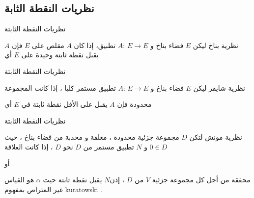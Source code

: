 \documentclass[dvipsnames,mathserif]{beamer}
\begin{document}
  \subsection{نظريات النقطة الثابة }
    \begin{frame}{ نظريات النقطة الثابتة }
\begin{mybox}[colbacktitle = green]{ نظرية بناخ}
{\LARGE{}}
ليكن $E$ فضاء بناخ و $A:\,E\to E$  تطبيق،
إذا كان  $A$  مقلص على  $E$ فإن  $A$ يقبل نقطة ثابتة وحيدة على  
$E$
 أي  
\begin{center}
\end{center}
  \end{mybox}
  \end{frame}
  \begin{frame}{ نظريات النقطة الثابتة }
   \begin{mybox}[colbacktitle = green]{ نظرية شايفر}
{\LARGE{}}
ليكن  $E$ فضاء بناخ و $A:\,E\to E$ تطبيق مستمر كليا ،
إذا كانت المجموعة
\begin{center}
 \otherbox{ \xi=\left. \big\{ y\in E\,,\,y=\lambda Ay\,,\,\lambda \in \big] 0,1 \big[ \big. \right\}} 
 \end{center}
 محدودة
فإن  $A$  يقبل على الأقل نقطة ثابتة في  $E$  أي 

  \end{mybox}
  \end{frame}
  \begin{frame}{ نظريات النقطة الثابتة }
   \vspace{-0.3cm}
     \begin{mybox}[colbacktitle = green]{ نظرية مونش}
{\LARGE{}}
لتكن $D$ مجموعة جزئية محدودة ، مغلقة و محدبة من فضاء بناخ ، حيث $0\in D$ و $N$ تطبيق مستمر من $D$ نحو $D$ ، إذا كانت العلاقة
 \begin{center}
\end{center}
أو 
~~~~~~~~~~~~~~~~~~~~
 
   محققة من أجل كل مجموعة جزئية $V$ من $D$ ، إذن$N$ يقبل نقطة ثابتة 
حيث
$\alpha $ هو القياس غير المتراص بمفهوم kuratowski
.
  \end{mybox}
  \end{frame}
\end{document}

